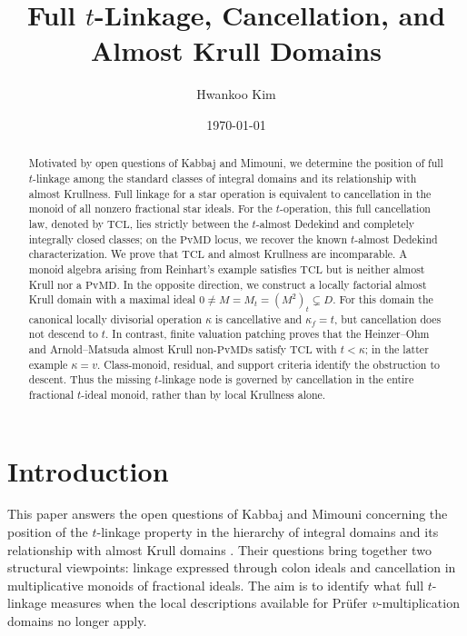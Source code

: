 \documentclass[11pt]{amsart}
\title[Full $t$-Linkage and Almost Krull Domains]
{Full $t$-Linkage, Cancellation, and Almost Krull Domains}
\author{Hwankoo Kim}
\date{}
\date{\today}
\theoremstyle{definition}
\theoremstyle{remark}
\newcommand{\PvMD}{\mathrm{PvMD}}
\newcommand{\TCL}{\mathrm{TCL}}
\begin{document}
\begin{abstract}
Motivated by open questions of Kabbaj and Mimouni, we determine the position
of full $t$-linkage among the standard classes of integral domains and its
relationship with almost Krullness.  Full linkage for a star operation is
equivalent to cancellation in the monoid of all nonzero fractional star
ideals.  For the $t$-operation, this full cancellation law, denoted by
$\TCL$, lies strictly between the $t$-almost Dedekind and completely
integrally closed classes; on the $\PvMD$ locus, we recover the known
$t$-almost Dedekind characterization.  We prove that $\TCL$ and almost
Krullness are incomparable.  A monoid algebra arising from Reinhart's
example satisfies $\TCL$ but is neither almost Krull nor a $\PvMD$.
In the opposite direction, we construct a locally factorial almost Krull
domain with a maximal ideal $0\ne M=M_t=(M^2)_t\subsetneq D$.
For this domain the canonical locally divisorial operation $\kappa$ is
cancellative and $\kappa_f=t$, but cancellation does not descend to $t$.
In contrast, finite valuation patching proves that the Heinzer--Ohm and
Arnold--Matsuda almost Krull non-$\PvMD$s satisfy $\TCL$ with
$t<\kappa$; in the latter example $\kappa=v$.  Class-monoid, residual,
and support criteria identify the obstruction to descent.  Thus the
missing $t$-linkage node is governed by cancellation in the entire
fractional $t$-ideal monoid, rather than by local Krullness alone.
\end{abstract}

\maketitle

\section{Introduction}\label{sec:introduction}

This paper answers the open questions of Kabbaj and Mimouni concerning the
position of the $t$-linkage property in the hierarchy of integral domains
and its relationship with almost Krull domains
\cite[Figure~1 and p.~11]{KabbajMimouniStar}.  Their questions bring together
two structural viewpoints: linkage expressed through colon ideals and
cancellation in multiplicative monoids of fractional ideals.  The aim is
to identify what full $t$-linkage measures when the local descriptions
available for Pr\"ufer $v$-multiplication domains no longer apply.
\end{document}
